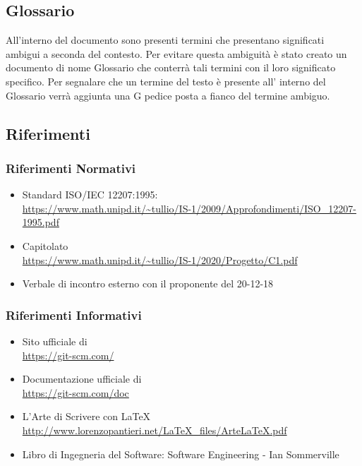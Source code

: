 \subsection{Glossario}
All’interno del  documento sono presenti termini che presentano significati ambigui a seconda del contesto.
Per evitare questa ambiguità è stato creato un  documento di nome Glossario che  conterrà tali termini con il loro significato specifico. Per segnalare che un termine del testo è presente all’ interno del Glossario  
verrà aggiunta una G pedice posta a fianco del termine ambiguo. 

\subsection{Riferimenti}
\subsubsection{Riferimenti Normativi}
\begin{itemize}
\item{Standard ISO/IEC 12207:1995: \\
\url{https://www.math.unipd.it/~tullio/IS-1/2009/Approfondimenti/ISO_12207-1995.pdf}}
\item{Capitolato \\
\url{https://www.math.unipd.it/~tullio/IS-1/2020/Progetto/C1.pdf}}
\item{Verbale di incontro esterno con il proponente  del 20-12-18}
\end{itemize}

\subsubsection{Riferimenti Informativi}
\begin{itemize}
\item{Sito ufficiale di  \\
\url{https://git-scm.com/}}
\item{Documentazione ufficiale di  \\
\url{https://git-scm.com/doc}}
\item{L’Arte di Scrivere con \LaTeX \\
\url{http://www.lorenzopantieri.net/LaTeX_files/ArteLaTeX.pdf}}
\item{Libro di Ingegneria del Software: Software Engineering - Ian Sommerville}
\end{itemize}
